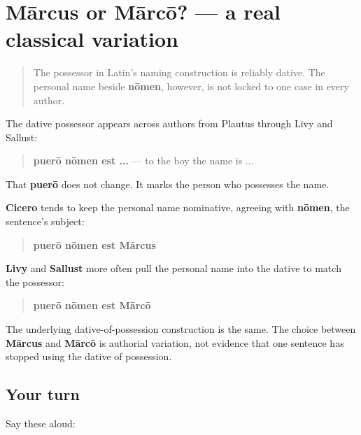 \section[puerō nōmen est Mārcus / Mārcō]{Mārcus or Mārcō? — a real classical variation}

\label{lesson:LA-C20-name-case-variation}



\begin{quote}
The possessor in Latin's naming construction is reliably dative. The personal name beside \textbf{nōmen}, however, is not locked to one case in every author.
\end{quote}

\begin{grammarlens}[title={Grammar Lens: The stable frame}]
The dative possessor appears across authors from Plautus through Livy and Sallust:

\begin{quote}
\textbf{puerō nōmen est ...} — to the boy the name is ...
\end{quote}

That \textbf{puerō} does not change. It marks the person who possesses the name.
\end{grammarlens}

\begin{grammarlens}[title={Grammar Lens: Two habits for the personal name}]
\textbf{Cicero} tends to keep the personal name nominative, agreeing with \textbf{nōmen}, the sentence's subject:

\begin{quote}
\textbf{puerō nōmen est Mārcus}
\end{quote}

\textbf{Livy} and \textbf{Sallust} more often pull the personal name into the dative to match the possessor:

\begin{quote}
\textbf{puerō nōmen est Mārcō}
\end{quote}

The underlying dative-of-possession construction is the same. The choice between \textbf{Mārcus} and \textbf{Mārcō} is authorial variation, not evidence that one sentence has stopped using the dative of possession.
\end{grammarlens}

\subsection*{Your turn}
Say these aloud:

